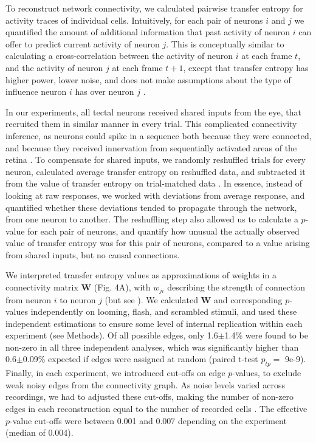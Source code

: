 \documentclass{article}
\begin{document}
To reconstruct network connectivity, we calculated pairwise transfer entropy \citep{gourevitch2007te,stetter2012te} for activity traces of individual cells. Intuitively, for each pair of neurons $i$ and $j$ we quantified the amount of additional information that past activity of neuron $i$ can offer to predict current activity of neuron $j$. This is conceptually similar to calculating a cross-correlation between the activity of neuron $i$ at each frame $t$, and the activity of neuron $j$ at each frame $t+1$, except that transfer entropy has higher power, lower noise, and does not make assumptions about the type of influence neuron $i$ has over neuron $j$ \citep{stetter2012te}.

In our experiments, all tectal neurons received shared inputs from the eye, that recruited them in similar manner in every trial. This complicated connectivity inference, as neurons could spike in a sequence both because they were connected, and because they received innervation from sequentially activated areas of the retina \citep{mehler2018lure}. To compensate for shared inputs, we randomly reshuffled trials for every neuron, calculated average transfer entropy on reshuffled data, and subtracted it from the value of transfer entropy on trial-matched data \citep{gourevitch2007te,wollstadt2014te}. In essence, instead of looking at raw responses, we worked with deviations from average response, and quantified whether these deviations tended to propagate through the network, from one neuron to another. The reshuffling step also allowed us to calculate a $p$-value for each pair of neurons, and quantify how unusual the actually observed value of transfer entropy was for this pair of neurons, compared to a value arising from shared inputs, but no causal connections.

We interpreted transfer entropy values as approximations of weights in a connectivity matrix $\textbf{W}$ (Fig. 4A), with $w_{ji}$ describing the strength of connection from neuron $i$ to neuron $j$ (but see \citealt{mehler2018lure}). We calculated $\textbf{W}$ and corresponding $p$-values independently on looming, flash, and scrambled stimuli, and used these independent estimations to ensure some level of internal replication within each experiment (see Methods). Of all possible edges, only 1.6$\pm$1.4\% were found to be non-zero in all three independent analyses, which was significantly higher than 0.6$\pm$0.09\% expected if edges were assigned at random (paired t-test $p_{tp}=$ 9e-9). Finally, in each experiment, we introduced cut-offs on edge $p$-values, to exclude weak noisy edges from the connectivity graph. As noise levels varied across recordings, we had to adjusted these cut-offs, making the number of non-zero edges in each reconstruction equal to the number of recorded cells \citep{stetter2012te}. The effective $p$-value cut-offs were between 0.001 and 0.007 depending on the experiment (median of 0.004).
\end{document}
